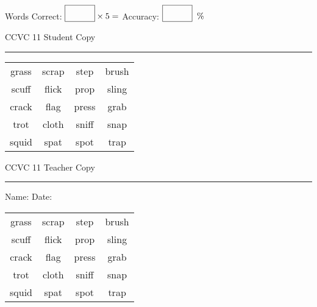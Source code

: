 \documentclass{memoir}
\begin{document}
\normalsize

Words Correct: $\fbox{\phantom{\huge 100}} \times 5 = $ Accuracy: $\fbox{\phantom{\huge 100}}\;\; \%$ 

\vfill

\newpage


\footnotesize \noindent
CCVC 11 \hfill Student Copy
\smallskip
\hrule

\Large

\setlength{\tabcolsep}{14pt}
\def\arraystretch{3}

{\selectfont


\begin{vplace}[0.5]
\begin{center}
\begin{tabular}{cccc}
grass                    & scrap & step & brush \\
scuff & flick            & prop & sling \\
crack       & flag             & press       & grab                    \\
trot & cloth & sniff & snap \\
squid & spat            & spot & trap \\
\end{tabular}
\end{center}
\end{vplace}

}

\newpage

\footnotesize \noindent
CCVC 11 \hfill Teacher Copy
\smallskip
\hrule

\normalsize

\vfill

\noindent
Name: \underline{\hspace{1.75in}} \hfill Date: \underline{\hspace{1in}}

\Large

{\selectfont


\begin{vplace}[0.5]
\begin{center}
\begin{tabular}{cccc}
grass                    & scrap & step & brush \\
scuff & flick            & prop & sling \\
crack       & flag             & press       & grab                    \\
trot & cloth & sniff & snap \\
squid & spat            & spot & trap \\
\end{tabular}
\end{center}
\end{vplace}



}
\end{document}
